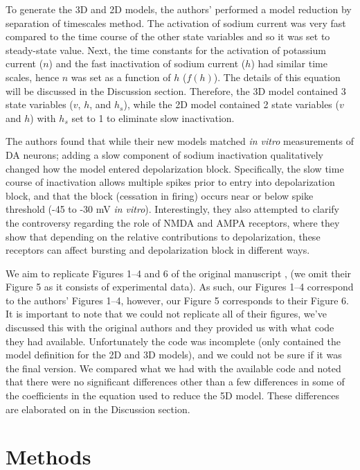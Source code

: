 To generate the 3D and 2D models, the authors’ performed a model reduction by separation of timescales method. The activation of sodium current was very fast compared to the time course of the other state variables and so it was set to steady-state value. Next, the time constants for the activation of potassium current ($n$) and the fast inactivation of sodium current ($h$) had similar time scales, hence $n$ was set as a function of $h$ ($f(h)$). The details of this equation will be discussed in the Discussion section. Therefore, the 3D model contained 3 state variables ($v$, $h$, and $h_s$), while the 2D model contained 2 state variables ($v$ and $h$) with $h_s$ set to 1 to eliminate slow inactivation. 

The authors found that while their new models matched \emph{in vitro} measurements of DA neurons; adding a slow component of sodium inactivation qualitatively changed how the model entered depolarization block. Specifically, the slow time course of inactivation allows multiple spikes prior to entry into depolarization block, and that the block (cessation in firing) occurs near or below spike threshold (-45 to -30 mV \emph{in vitro}). Interestingly, they also attempted to clarify the controversy regarding the role of NMDA and AMPA receptors, where they show that depending on the relative contributions to depolarization, these receptors can affect bursting and depolarization block in different ways. 

We aim to replicate Figures 1--4 and 6 of the original manuscript \cite{Qian2014}, (we omit their Figure 5 as it consists of experimental data). As such, our Figures 1--4 correspond to the authors' Figures 1--4, however, our Figure 5 corresponds to their Figure 6. It is important to note that we could not replicate all of their figures, we've discussed this with the original authors and they provided us with what code they had available. Unfortunately the code was incomplete (only contained the model definition for the 2D and 3D models), and we could not be sure if it was the final version. We compared what we had with the available code and noted that there were no significant differences other than a few differences in some of the coefficients in the equation used to reduce the 5D model. These differences are elaborated on in the Discussion section.



\section{Methods}

